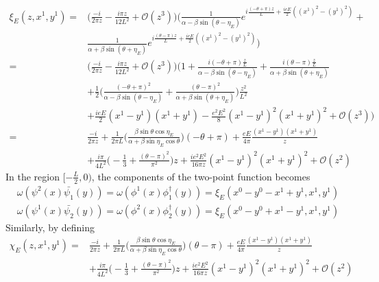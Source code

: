 \begin{equation}
\begin{split}
\xi_E(z, x^1, y^1) = & \Big( \frac{-i}{2 \pi z} - \frac{i \pi z}{12L^2} + \mathcal{O}(z^3) \Big)
\Big( \frac{1}{\alpha - \beta\sin(\theta - \eta_E)}e^{i\frac{(-\theta + \pi)z}{L} + \frac{ieE}{2}((x^1)^2 - (y^1)^2)} + \\
& \frac{1}{\alpha + \beta\sin(\theta + \eta_E)}e^{i\frac{(\theta - \pi) z}{L} + \frac{ieE}{2}((x^1)^2 - (y^1)^2)} \Big)  \\
= & \Big( \frac{-i}{2 \pi z} - \frac{i \pi z}{12L^2} + \mathcal{O}(z^3) \Big)
\Big( 1 + \frac{i(-\theta + \pi)\frac{z}{L}}{\alpha - \beta\sin(\theta - \eta_E)} + \frac{i(\theta - \pi)\frac{z}{L}}{\alpha + \beta\sin(\theta + \eta_E)}  \\
& + \frac{1}{2}\Big(\frac{(-\theta + \pi)^2}{\alpha - \beta \sin (\theta - \eta_E)}  
+ \frac{(\theta - \pi)^2}{\alpha + \beta \sin (\theta + \eta_E)} \Big)\frac{z^2}{L^2} \\
& + \frac{ieE}{2}(x^1 - y^1)(x^1 + y^1) - \frac{e^2 E^2}{8}(x^1 - y^1)^2 (x^1 + y^1)^2
+ \mathcal{O}(z^3)  \Big)  \\
= & \frac{-i}{2 \pi z} + \frac{1}{2\pi L}\Big( \frac{\beta \sin \theta \cos \eta_E}{\alpha + \beta \sin \eta_E \cos \theta}\Big) (-\theta + \pi) + \frac{eE}{4 \pi}\frac{(x^1 - y^1)(x^1 + y^1)}{z}     \\
& + \frac{i\pi}{4 L^2}\big( -\frac{1}{3} + \frac{(\theta - \pi)^2}{\pi^2}\big)z
+ \frac{i e^2 E^2}{16 \pi z} (x^1 - y^1)^2 (x^1 + y^1)^2
+ \mathcal{O}(z^2)
\end{split}
\end{equation}
In the region $[-\frac{L}{2}, 0)$, the components of the two-point function becomes
\begin{equation*}
\begin{split}
\omega(\psi^2(x) \bar{\psi_1}(y)) = 
\omega(\phi^1(x) \phi^\dagger_1(y)) = \xi_E(x^0 - y^0 - x^1 + y^1, x^1, y^1) \\
 \omega(\psi^1(x) \bar{\psi_2}(y)) = 
\omega(\phi^2(x) \phi^\dagger_2(y)) = \xi_E(x^0 - y^0 + x^1 - y^1, x^1, y^1)
\end{split}
\end{equation*}
Similarly, by defining 
\begin{equation}
\begin{split}
\chi_E(z, x^1, y^1) = 
& \frac{-i}{2 \pi z} + \frac{1}{2\pi L}\Big( \frac{\beta \sin \theta \cos \eta_E}{\alpha + \beta \sin \eta_E \cos \theta}\Big) (\theta - \pi) + \frac{eE}{4 \pi}\frac{(x^1 - y^1)(x^1 + y^1)}{z}     \\
& + \frac{i\pi}{4 L^2}\big( -\frac{1}{3} + \frac{(\theta - \pi)^2}{\pi^2}\big)z
+ \frac{i e^2 E^2}{16 \pi z} (x^1 - y^1)^2 (x^1 + y^1)^2
+ \mathcal{O}(z^2)
\end{split}
\end{equation}
